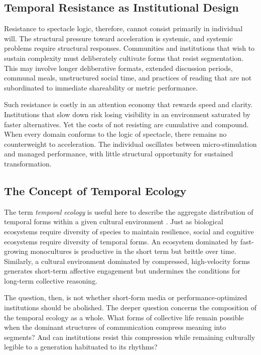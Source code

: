 \documentclass[11pt]{article}
\begin{document}
\subsection{Temporal Resistance as Institutional Design}

Resistance to spectacle logic, therefore, cannot consist primarily in individual will. The structural pressure toward acceleration is systemic, and systemic problems require structural responses. Communities and institutions that wish to sustain complexity must deliberately cultivate forms that resist segmentation. This may involve longer deliberative formats, extended discussion periods, communal meals, unstructured social time, and practices of reading that are not subordinated to immediate shareability or metric performance.

Such resistance is costly in an attention economy that rewards speed and clarity. Institutions that slow down risk losing visibility in an environment saturated by faster alternatives. Yet the costs of not resisting are cumulative and compound. When every domain conforms to the logic of spectacle, there remains no counterweight to acceleration. The individual oscillates between micro-stimulation and managed performance, with little structural opportunity for sustained transformation.

\subsection{The Concept of Temporal Ecology}

The term \emph{temporal ecology} is useful here to describe the aggregate distribution of temporal forms within a given cultural environment \citep{Hassan2003}. Just as biological ecosystems require diversity of species to maintain resilience, social and cognitive ecosystems require diversity of temporal forms. An ecosystem dominated by fast-growing monocultures is productive in the short term but brittle over time. Similarly, a cultural environment dominated by compressed, high-velocity forms generates short-term affective engagement but undermines the conditions for long-term collective reasoning.

The question, then, is not whether short-form media or performance-optimized institutions should be abolished. The deeper question concerns the composition of the temporal ecology as a whole. What forms of collective life remain possible when the dominant structures of communication compress meaning into segments? And can institutions resist this compression while remaining culturally legible to a generation habituated to its rhythms?
\end{document}
